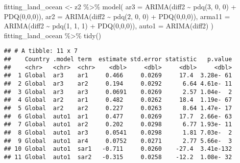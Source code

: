 \documentclass[
]{article}
\newenvironment{Shaded}{\begin{snugshade}}{\end{snugshade}}
\newcommand{\AttributeTok}[1]{\textcolor[rgb]{0.77,0.63,0.00}{#1}}
\newcommand{\DecValTok}[1]{\textcolor[rgb]{0.00,0.00,0.81}{#1}}
\newcommand{\FunctionTok}[1]{\textcolor[rgb]{0.00,0.00,0.00}{#1}}
\newcommand{\NormalTok}[1]{#1}
\newcommand{\OtherTok}[1]{\textcolor[rgb]{0.56,0.35,0.01}{#1}}
\newcommand{\SpecialCharTok}[1]{\textcolor[rgb]{0.00,0.00,0.00}{#1}}
\begin{document}
\begin{Shaded}
\begin{Highlighting}[]
\NormalTok{fitting\_land\_ocean }\OtherTok{\textless{}{-}}\NormalTok{ z2 }\SpecialCharTok{\%\textgreater{}\%}
  \FunctionTok{model}\NormalTok{(}
        \AttributeTok{ar3 =} \FunctionTok{ARIMA}\NormalTok{(diff2 }\SpecialCharTok{\textasciitilde{}} \FunctionTok{pdq}\NormalTok{(}\DecValTok{3}\NormalTok{, }\DecValTok{0}\NormalTok{, }\DecValTok{0}\NormalTok{) }\SpecialCharTok{+} \FunctionTok{PDQ}\NormalTok{(}\DecValTok{0}\NormalTok{,}\DecValTok{0}\NormalTok{,}\DecValTok{0}\NormalTok{)),}
        \AttributeTok{ar2 =} \FunctionTok{ARIMA}\NormalTok{(diff2 }\SpecialCharTok{\textasciitilde{}} \FunctionTok{pdq}\NormalTok{(}\DecValTok{2}\NormalTok{, }\DecValTok{0}\NormalTok{, }\DecValTok{0}\NormalTok{) }\SpecialCharTok{+} \FunctionTok{PDQ}\NormalTok{(}\DecValTok{0}\NormalTok{,}\DecValTok{0}\NormalTok{,}\DecValTok{0}\NormalTok{)), }
        \AttributeTok{arma11 =} \FunctionTok{ARIMA}\NormalTok{(diff2 }\SpecialCharTok{\textasciitilde{}} \FunctionTok{pdq}\NormalTok{(}\DecValTok{1}\NormalTok{, }\DecValTok{1}\NormalTok{, }\DecValTok{1}\NormalTok{) }\SpecialCharTok{+} \FunctionTok{PDQ}\NormalTok{(}\DecValTok{0}\NormalTok{,}\DecValTok{0}\NormalTok{,}\DecValTok{0}\NormalTok{)), }
        \AttributeTok{auto1 =} \FunctionTok{ARIMA}\NormalTok{(diff2)}
\NormalTok{        )}
\NormalTok{fitting\_land\_ocean }\SpecialCharTok{\%\textgreater{}\%} \FunctionTok{tidy}\NormalTok{()}
\end{Highlighting}
\end{Shaded}

\begin{verbatim}
## # A tibble: 11 x 7
##    Country .model term  estimate std.error statistic   p.value
##    <chr>   <chr>  <chr>    <dbl>     <dbl>     <dbl>     <dbl>
##  1 Global  ar3    ar1     0.466     0.0269     17.4  3.28e- 61
##  2 Global  ar3    ar2     0.194     0.0292      6.64 4.61e- 11
##  3 Global  ar3    ar3     0.0691    0.0269      2.57 1.04e-  2
##  4 Global  ar2    ar1     0.482     0.0262     18.4  1.19e- 67
##  5 Global  ar2    ar2     0.227     0.0263      8.64 1.47e- 17
##  6 Global  auto1  ar1     0.477     0.0269     17.7  2.66e- 63
##  7 Global  auto1  ar2     0.202     0.0298      6.77 1.93e- 11
##  8 Global  auto1  ar3     0.0541    0.0298      1.81 7.03e-  2
##  9 Global  auto1  ar4     0.0752    0.0271      2.77 5.66e-  3
## 10 Global  auto1  sar1   -0.711     0.0260    -27.4  3.41e-132
## 11 Global  auto1  sar2   -0.315     0.0258    -12.2  1.08e- 32
\end{verbatim}
\end{document}
